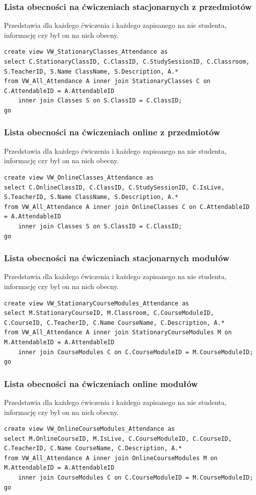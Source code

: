 \documentclass[11pt,a4paper]{article}
\begin{document}
\subsubsection{Lista obecności na ćwiczeniach stacjonarnych z przedmiotów}
Przedstawia dla każdego ćwiczenia i każdego zapisanego na nie studenta, informację czy był on na nich obecny.
\begin{Verbatim}[breaklines=true]
create view VW_StationaryClasses_Attendance as
select C.StationaryClassID, C.ClassID, C.StudySessionID, C.Classroom, S.TeacherID, S.Name ClassName, S.Description, A.*
from VW_All_Attendance A inner join StationaryClasses C on C.AttendableID = A.AttendableID
    inner join Classes S on S.ClassID = C.ClassID;
go
\end{Verbatim}

\subsubsection{Lista obecności na ćwiczeniach online z przedmiotów}
Przedstawia dla każdego ćwiczenia i każdego zapisanego na nie studenta, informację czy był on na nich obecny.
\begin{Verbatim}[breaklines=true]
create view VW_OnlineClasses_Attendance as
select C.OnlineClassID, C.ClassID, C.StudySessionID, C.IsLive, S.TeacherID, S.Name ClassName, S.Description, A.*
from VW_All_Attendance A inner join OnlineClasses C on C.AttendableID = A.AttendableID
    inner join Classes S on S.ClassID = C.ClassID;
go
\end{Verbatim}

\subsubsection{Lista obecności na ćwiczeniach stacjonarnych modułów}
Przedstawia dla każdego ćwiczenia i każdego zapisanego na nie studenta, informację czy był on na nich obecny.
\begin{Verbatim}[breaklines=true]
create view VW_StationaryCourseModules_Attendance as
select M.StationaryCourseID, M.Classroom, C.CourseModuleID, C.CourseID, C.TeacherID, C.Name CourseName, C.Description, A.*
from VW_All_Attendance A inner join StationaryCourseModules M on M.AttendableID = A.AttendableID
    inner join CourseModules C on C.CourseModuleID = M.CourseModuleID;
go
\end{Verbatim}

\subsubsection{Lista obecności na ćwiczeniach online modułów}
Przedstawia dla każdego ćwiczenia i każdego zapisanego na nie studenta, informację czy był on na nich obecny.
\begin{Verbatim}[breaklines=true]
create view VW_OnlineCourseModules_Attendance as
select M.OnlineCourseID, M.IsLive, C.CourseModuleID, C.CourseID, C.TeacherID, C.Name CourseName, C.Description, A.*
from VW_All_Attendance A inner join OnlineCourseModules M on M.AttendableID = A.AttendableID
    inner join CourseModules C on C.CourseModuleID = M.CourseModuleID;
go
\end{Verbatim}
\end{document}
